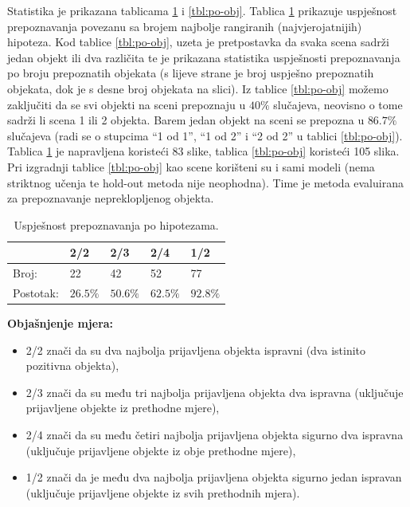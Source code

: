 \documentclass[lmodern, utf8, seminar, numeric]{fer}
\begin{document}
Statistika je prikazana tablicama \ref{tbl:po-hipot} i \ref{tbl:po-obj}. Tablica
\ref{tbl:po-hipot} prikazuje uspješnost prepoznavanja povezanu sa brojem
najbolje rangiranih (najvjerojatnijih) hipoteza. Kod tablice \ref{tbl:po-obj},
uzeta je pretpostavka da svaka scena sadrži jedan objekt ili dva različita te je
prikazana statistika uspješnosti prepoznavanja po broju prepoznatih objekata (s
lijeve strane je broj uspješno prepoznatih objekata, dok je s desne broj
objekata na slici). Iz tablice \ref{tbl:po-obj} možemo zaključiti da se svi
objekti na sceni prepoznaju u $40\%$ slučajeva, neovisno o tome sadrži li scena
1 ili 2 objekta. Barem jedan objekt na sceni se prepozna u $86.7\%$ slučajeva
(radi se o stupcima ``1 od 1'', ``1 od 2'' i ``2 od 2'' u tablici
\ref{tbl:po-obj}).
Tablica \ref{tbl:po-hipot} je napravljena koristeći 83 slike, tablica
\ref{tbl:po-obj} koristeći 105 slika. Pri izgradnji tablice \ref{tbl:po-obj} kao
scene korišteni su i sami modeli (nema striktnog učenja te hold-out metoda nije
neophodna). Time je metoda evaluirana za prepoznavanje nepreklopljenog objekta.

\begin{table}[htb]
\centering
\caption{Uspješnost prepoznavanja po hipotezama.}
\label{tbl:po-hipot}
\begin{tabular}{l l l l l}
\toprule
 & 2/2 & 2/3 & 2/4 & 1/2\\
\midrule
Broj: & 22 & 42 & 52 & 77\\
Postotak: & $26.5\%$ & $50.6\%$ & $62.5\%$ & $92.8\%$\\
\bottomrule
\end{tabular}
\end{table}

\textbf{Objašnjenje mjera:}
\begin{itemize}
    \item 2/2 znači da su dva najbolja prijavljena objekta ispravni (dva istinito pozitivna objekta),
    \item 2/3 znači da su među tri najbolja prijavljena objekta dva ispravna (uključuje prijavljene objekte iz prethodne mjere),
    \item 2/4 znači da su među četiri najbolja prijavljena objekta sigurno dva ispravna (uključuje prijavljene objekte iz obje prethodne mjere),
    \item 1/2 znači da je među dva najbolja prijavljena objekta sigurno jedan ispravan (uključuje prijavljene objekte iz svih prethodnih mjera).
\end{itemize}
\end{document}
